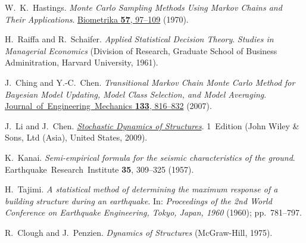 {\hangindent=0.33in {}\hypertarget{1755040324625540940}{}W.~K.~Hastings. \emph{Monte Carlo Sampling Methods Using Markov Chains and Their Applications}. \href{https://doi.org/10.1093/biomet/57.1.97}{Biometrika \textbf{57}, 97–109} (1970).

\hangindent=0.33in {}\hypertarget{16839907763403924006}{}H.~Raiffa and R.~Schaifer. \emph{Applied Statistical Decision Theory}. \emph{Studies in Managerial Economics} (Division of Research, Graduate School of Business Adminitration, Harvard University, 1961).

\hangindent=0.33in {}\hypertarget{7619550157776039859}{}J.~Ching and Y.-C.~Chen. \emph{Transitional Markov Chain Monte Carlo Method for Bayesian Model Updating, Model Class Selection, and Model Averaging}. \href{https://doi.org/10.1061/(ASCE)0733-9399(2007)133:7(816)}{Journal~of~Engineering~Mechanics \textbf{133}, 816–832} (2007).

\hangindent=0.33in {}\hypertarget{2227099348983167607}{}J.~Li and J.~Chen. \href{https://www.wiley.com/en-us/Stochastic+Dynamics+of+Structures-p-9780470824252}{\emph{Stochastic Dynamics of Structures}}. 1~Edition (John Wiley \& Sons, Ltd (Asia), United States, 2009).

\hangindent=0.33in {}\hypertarget{13534374753547515349}{}K.~Kanai. \emph{Semi-empirical formula for the seismic characteristics of the ground}. Earthquake~Research~Institute \textbf{35}, 309–325 (1957).

\hangindent=0.33in {}\hypertarget{5778133231777751075}{}H.~Tajimi. \emph{A statistical method of determining the maximum response of a building structure during an earthquake}. In: \emph{Proceedings of the 2nd World Conference on Earthquake Engineering, Tokyo, Japan, 1960} (1960); pp.~781–797.

\hangindent=0.33in {}\hypertarget{16593283455700884559}{}R.~Clough and J.~Penzien. \emph{Dynamics of Structures} (McGraw-Hill, 1975).

}
